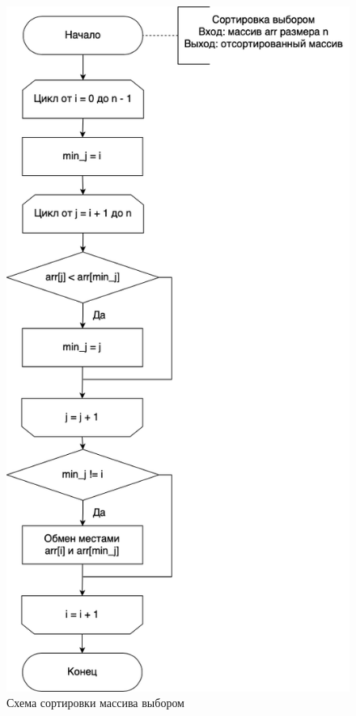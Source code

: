 \documentclass[a4paper,14pt, unknownkeysallowed]{extreport}
\begin{document}
\begin{figure}[h]
	\centering
	\includegraphics[scale=0.65]{img/select_sort_scheme.png}
	\caption{Схема сортировки массива выбором}
	\label{fig:select_sort}
\end{figure}
\end{document}
